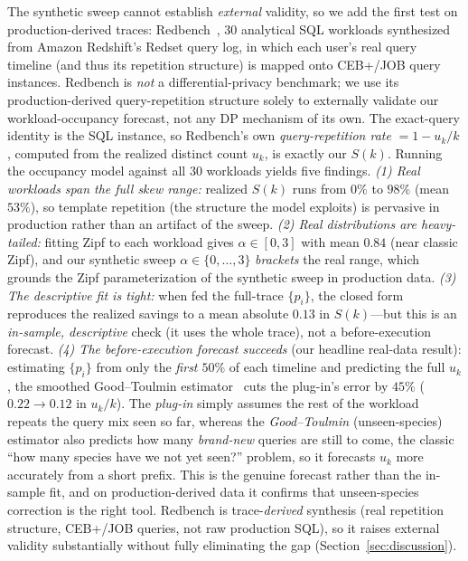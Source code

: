 \documentclass[sigconf,nonacm]{acmart}
\begin{document}
The synthetic sweep cannot establish \emph{external} validity, so we add the first test on production-derived traces: Redbench~\cite{redbench2025}, 30 analytical SQL workloads synthesized from Amazon Redshift's Redset query log, in which each user's real query timeline (and thus its repetition structure) is mapped onto CEB+/JOB query instances. Redbench is \emph{not} a differential-privacy benchmark; we use its production-derived query-repetition structure solely to externally validate our workload-occupancy forecast, not any DP mechanism of its own. The exact-query identity is the SQL instance, so Redbench's own \emph{query-repetition rate} $=1-u_k/k$, computed from the realized distinct count $u_k$, is exactly our $S(k)$. Running the occupancy model against all 30 workloads yields five findings.
\emph{(1) Real workloads span the full skew range:} realized $S(k)$ runs from $0\%$ to $98\%$ (mean $53\%$), so template repetition (the structure the model exploits) is pervasive in production rather than an artifact of the sweep.
\emph{(2) Real distributions are heavy-tailed:} fitting Zipf to each workload gives $\alpha\in[0,3]$ with mean $0.84$ (near classic Zipf), and our synthetic sweep $\alpha\in\{0,\dots,3\}$ \emph{brackets} the real range, which grounds the Zipf parameterization of the synthetic sweep in production data.
\emph{(3) The descriptive fit is tight:} when fed the full-trace $\{p_i\}$, the closed form reproduces the realized savings to a mean absolute $0.13$ in $S(k)$---but this is an \emph{in-sample, descriptive} check (it uses the whole trace), not a before-execution forecast.
\emph{(4) The before-execution forecast succeeds} (our headline real-data result): estimating $\{p_i\}$ from only the \emph{first $50\%$} of each timeline and predicting the full $u_k$, the smoothed Good--Toulmin estimator~\cite{orlitsky2016unseen} cuts the plug-in's error by $45\%$ ($0.22\!\to\!0.12$ in $u_k/k$). The \emph{plug-in} simply assumes the rest of the workload repeats the query mix seen so far, whereas the \emph{Good--Toulmin} (unseen-species) estimator also predicts how many \emph{brand-new} queries are still to come, the classic ``how many species have we not yet seen?'' problem, so it forecasts $u_k$ more accurately from a short prefix. This is the genuine forecast rather than the in-sample fit, and on production-derived data it confirms that unseen-species correction is the right tool. Redbench is trace-\emph{derived} synthesis (real repetition structure, CEB+/JOB queries, not raw production SQL), so it raises external validity substantially without fully eliminating the gap (Section~\ref{sec:discussion}).
\end{document}
